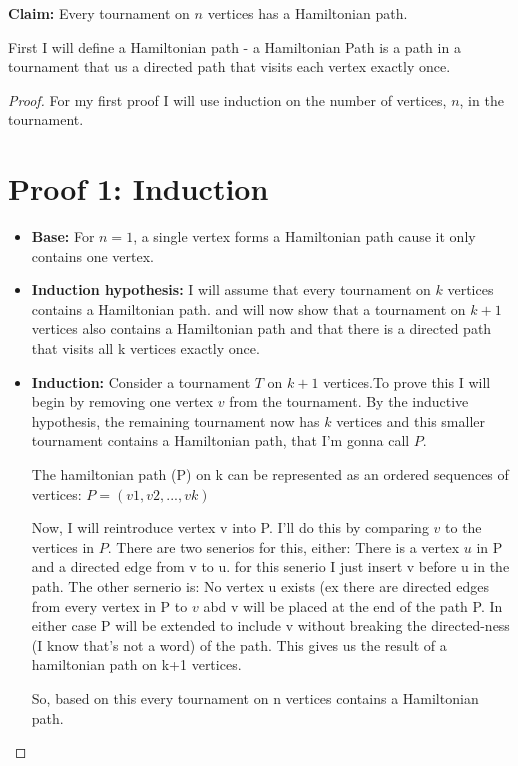 \documentclass[10pt, AMS Euler]{article}
\begin{document}
\begin{enumerate}
\noindent\textbf{Claim:} Every tournament on $n$ vertices has a Hamiltonian path.

First I will define a Hamiltonian path - a Hamiltonian Path is a path in a tournament that us a directed path that visits each vertex exactly once. 
\begin{proof}
    For my first proof I will use induction on the number of vertices, $n$, in the tournament.
    \section*{Proof 1: Induction}

    \begin{itemize}
        \item \textbf{Base:} For $n = 1$, a single vertex forms a Hamiltonian path cause it only contains one vertex.
        
        \item \textbf{Induction hypothesis:} I will assume that every tournament on $k$ vertices contains a Hamiltonian path. and will now show that a tournament on $k+1$ vertices also contains a Hamiltonian path and that there is a directed path that visits all k vertices exactly once. 
        
        \item \textbf{Induction:} Consider a tournament $T$ on $k+1$ vertices.To prove this I will begin by removing one vertex $v$ from the tournament. By the inductive hypothesis, the remaining tournament now has $k$ vertices and this smaller tournament contains a Hamiltonian path, that I'm gonna call $P$.

        The hamiltonian path (P) on k can be represented as an ordered sequences of vertices: $P = (v1,v2,...,vk)$
        
        Now, I will reintroduce vertex v into P. I'll do this by comparing $v$ to the vertices in $P$. There are two senerios for this, either: There is a vertex $u$ in P and a directed edge from v to u. for this senerio I just insert v before u in the path. The other sernerio is: No vertex u exists (ex there are directed edges from every vertex in P to $v$ abd v will be placed at the end of the path P. In either case P will be extended to include v without breaking the directed-ness (I know that's not a word) of the path. This gives us the result of a hamiltonian path on k+1 vertices. 
        
        So, based on this every tournament on n vertices contains a Hamiltonian path. 
    \end{itemize}
    

\end{proof}
\end{enumerate}
\end{document}
